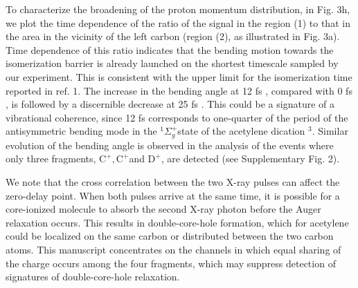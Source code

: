 \documentclass[10pt]{article}
\begin{document}
To characterize the broadening of the proton momentum distribution, in Fig. 3h, we plot the time dependence of the ratio of the signal in the region (1) to that in the area in the vicinity of the left carbon (region (2), as illustrated in Fig. 3a). Time dependence of this ratio indicates that the bending motion towards the isomerization barrier is already launched on the shortest timescale sampled by our experiment. This is consistent with the upper limit for the isomerization time reported in ref. 1. The increase in the bending angle at 12 fs , compared with 0 fs , is followed by a discernible decrease at 25 fs . This could be a signature of a vibrational coherence, since 12 fs corresponds to one-quarter of the period of the antisymmetric bending mode in the ${ }^{1} \Sigma_{g}^{+}$state of the acetylene dication ${ }^{3}$. Similar evolution of the bending angle is observed in the analysis of the events where only three fragments, $\mathrm{C}^{+}, \mathrm{C}^{+}$and $\mathrm{D}^{+}$, are detected (see Supplementary Fig. 2).

We note that the cross correlation between the two X-ray pulses can affect the zero-delay point. When both pulses arrive at the same time, it is possible for a core-ionized molecule to absorb the second X-ray photon before the Auger relaxation occurs. This results in double-core-hole formation, which for acetylene could be localized on the same carbon or distributed between the two carbon atoms. This manuscript concentrates on the channels in which equal sharing of the charge occurs among the four fragments, which may suppress detection of signatures of double-core-hole relaxation.
\end{document}
